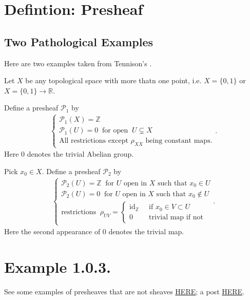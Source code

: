 \section{Defintion: Presheaf}

\subsection{Two Pathological Examples}

Here are two examples taken from Tennison's \cite{tennison1975sheaf}.

Let $X$ be any topological space with more thatn one point, i.e. $X=\{0,1\}$ or $X=\{0,1\}\to\mathbb R$.

Define a presheaf $\mathscr P_1$ by 
\begin{align*}
    \begin{cases}
        \mathscr P_1(X)=\mathbb Z \\
        \mathscr P_1(U)=0 ~\text{ for open }~ U\subsetneq X\\
        \text{All restrictions except $\rho_{XX}$ being constant maps.}
    \end{cases}.
\end{align*}Here $0$ denotes the trivial Abelian group.

Pick $x_0\in X$. Define a presheaf $\mathscr P_2$ by 
\begin{align*}
    \begin{cases}
        \mathscr P_2(U)=\mathbb Z ~\text{ for $U$ open in $X$ such that $x_0\in U$}\\
        \mathscr P_2(U)=0 ~\text{ for $U$ open in $X$ such that $x_0\notin U$}\\
        \text{restrictions }~ \rho_{UV}=\begin{cases}
            \operatorname{id}_{\mathbb Z} &~\text{ if $x_0\in V\subset U$}\\
            0 & ~\text{ trivial map if not}
        \end{cases}
    \end{cases}.
\end{align*}Here the second appearance of $0$ denotes the trivial map.

\section{Example 1.0.3.}

See some examples of presheaves that are not sheaves \href{https://en.wikipedia.org/wiki/Sheaf_(mathematics)}{HERE}; a post \href{https://math.stackexchange.com/questions/195363/constant-presheaf-not-necessarily-a-sheaf-proof}{HERE}.

